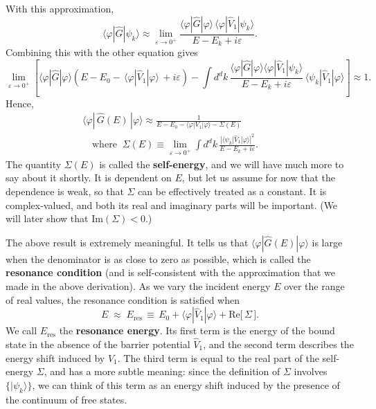 \documentclass[pra,12pt]{revtex4}
\begin{document}
With this approximation,
$$\langle\varphi|\hat{G}|\psi_k\rangle \approx \lim_{\varepsilon\rightarrow0^+} \frac{\langle\varphi|\hat{G}|\varphi\rangle \, \langle\varphi|\hat{V}_1|\psi_k\rangle}{E-E_k+i\varepsilon}.$$
Combining this with the other equation gives
$$\lim_{\varepsilon\rightarrow0^+} \left[\langle\varphi|\hat{G}|\varphi\rangle \left(E - E_0 -\, \langle\varphi|\hat{V}_1|\varphi\rangle \, + i\varepsilon\right) - \int d^dk\, \frac{\langle\varphi|\hat{G}|\varphi\rangle\langle\varphi|\hat{V}_1|\psi_k\rangle}{E-E_k+i\varepsilon} \, \langle\psi_k| \hat{V}_1|\varphi\rangle\right] \approx 1.$$
Hence,
$$\boxed{\begin{aligned}\langle\varphi|\,\hat{G}(E)\,|\varphi\rangle \approx \frac{1}{\displaystyle E - E_0 - \langle\varphi|V_1|\varphi\rangle - \Sigma(E)} \qquad \\ \quad \mathrm{where}\;\;\Sigma(E) \equiv \lim_{\varepsilon\rightarrow0^+} \int d^dk\, \frac{\displaystyle| \langle\psi_k| \hat{V}_1|\varphi\rangle|^2}{\displaystyle E-E_k+i\varepsilon}. \qquad
\end{aligned}}$$
The quantity $\Sigma(E)$ is called the \textbf{self-energy}, and we
will have much more to say about it shortly.  It is dependent on $E$,
but let us assume for now that the dependence is weak, so that
$\Sigma$ can be effectively treated as a constant.  It is
complex-valued, and both its real and imaginary parts will be
important.  (We will later show that $\mathrm{Im}(\Sigma) < 0$.)

The above result is extremely meaningful.  It tells us that
$\langle\varphi|\hat{G}(E)|\varphi\rangle$ is large when the
denominator is as close to zero as possible, which is called the
\textbf{resonance condition} (and is self-consistent with the
approximation that we made in the above derivation).  As we vary the
incident energy $E$ over the range of real values, the resonance
condition is satisfied when
$$E \;\approx\; E_{\mathrm{res}} \,\equiv\, E_0 + \langle\varphi|\hat{V}_1|\varphi\rangle + \mathrm{Re}\big[\,\Sigma\,\big].$$
We call $E_{\mathrm{res}}$ the \textbf{resonance energy}.  Its first
term is the energy of the bound state in the absence of the barrier
potential $\hat{V}_1$, and the second term describes the energy shift
induced by $\hat{V}_1$.  The third term is equal to the real part of
the self-energy $\Sigma$, and has a more subtle meaning: since the
definition of $\Sigma$ involves $\{|\psi_k\rangle\}$, we can think of
this term as an energy shift induced by the presence of the continuum
of free states.
\end{document}
